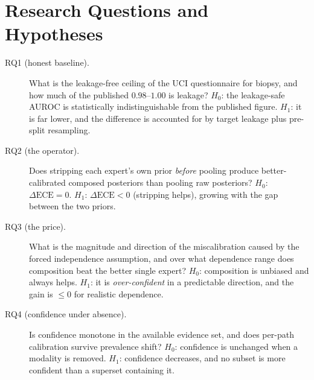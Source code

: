 \documentclass[sigplan,nonacm,screen]{acmart}
\begin{document}
\section{Research Questions and Hypotheses}

\begin{description}
  \item[RQ1 (honest baseline).] What is the leakage-free ceiling of the UCI questionnaire for biopsy, and how much of the published $0.98$--$1.00$ is leakage?
  $H_0$: the leakage-safe AUROC is statistically indistinguishable from the published figure. $H_1$: it is far lower, and the difference is accounted for by target leakage plus pre-split resampling.
  \item[RQ2 (the operator).] Does stripping each expert's own prior \emph{before} pooling produce better-calibrated composed posteriors than pooling raw posteriors?
  $H_0$: $\Delta\mathrm{ECE}=0$. $H_1$: $\Delta\mathrm{ECE}<0$ (stripping helps), growing with the gap between the two priors.
  \item[RQ3 (the price).] What is the magnitude and direction of the miscalibration caused by the forced independence assumption, and over what dependence range does composition beat the better single expert?
  $H_0$: composition is unbiased and always helps. $H_1$: it is \emph{over-confident} in a predictable direction, and the gain is $\le 0$ for realistic dependence.
  \item[RQ4 (confidence under absence).] Is confidence monotone in the available evidence set, and does per-path calibration survive prevalence shift?
  $H_0$: confidence is unchanged when a modality is removed. $H_1$: confidence decreases, and no subset is more confident than a superset containing it.
\end{description}
\end{document}

